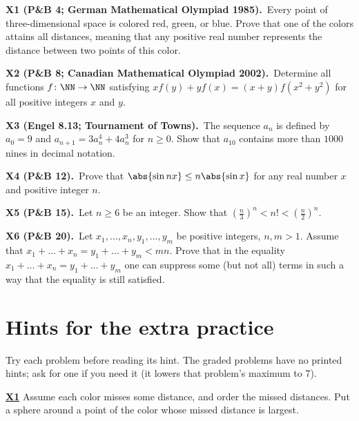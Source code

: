 \documentclass[10pt]{scrartcl}
\begin{document}
\begin{prob}\textbf{X1 (P\&B 4; German Mathematical Olympiad 1985).}\ Every point of three-dimensional space is colored red, green, or blue. Prove that one of the colors attains all distances, meaning that any positive real number represents the distance between two points of this color.\end{prob}
\begin{prob}\textbf{X2 (P\&B 8; Canadian Mathematical Olympiad 2002).}\ Determine all functions $f \colon \NN \to \NN$ satisfying $x f(y) + y f(x) = (x + y) f(x^2 + y^2)$ for all positive integers $x$ and $y$.\end{prob}
\begin{prob}\textbf{X3 (Engel 8.13; Tournament of Towns).}\ The sequence $a_n$ is defined by $a_0 = 9$ and $a_{n+1} = 3a_n^4 + 4a_n^3$ for $n \geq 0$. Show that $a_{10}$ contains more than $1000$ nines in decimal notation.\end{prob}
\begin{prob}\textbf{X4 (P\&B 12).}\ Prove that $\abs{\sin nx} \leq n\abs{\sin x}$ for any real number $x$ and positive integer $n$.\end{prob}
\begin{prob}\textbf{X5 (P\&B 15).}\ Let $n \geq 6$ be an integer. Show that $\left(\frac n3\right)^n < n! < \left(\frac n2\right)^n$.\end{prob}
\begin{prob}\textbf{X6 (P\&B 20).}\ Let $x_1, \dots, x_n, y_1, \dots, y_m$ be positive integers, $n, m > 1$. Assume that $x_1 + \dots + x_n = y_1 + \dots + y_m < mn$. Prove that in the equality $x_1 + \dots + x_n = y_1 + \dots + y_m$ one can suppress some (but not all) terms in such a way that the equality is still satisfied.\end{prob}

\section*{Hints for the extra practice}
Try each problem before reading its hint. The graded problems have no printed hints; ask for one if you need it (it lowers that problem's maximum to 7).

\par\medskip\noindent\textbf{\hyperlink{prob-X1}{X1}} Assume each color misses some distance, and order the missed distances. Put a sphere around a point of the color whose missed distance is largest.
\end{document}
